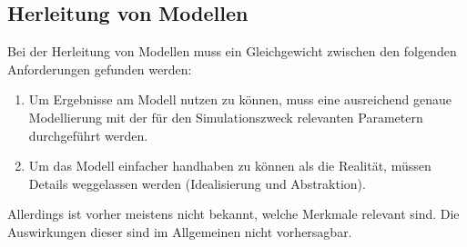         \subsection{Herleitung von Modellen} %
            Bei der Herleitung von Modellen muss ein Gleichgewicht zwischen den folgenden Anforderungen gefunden werden:
            \begin{enumerate}
            	\item Um Ergebnisse am Modell nutzen zu können, muss eine ausreichend genaue Modellierung mit der für den Simulationszweck relevanten Parametern durchgeführt werden.
            	\item Um das Modell einfacher handhaben zu können als die Realität, müssen Details weggelassen werden (Idealisierung und Abstraktion).
            \end{enumerate}
            Allerdings ist vorher meistens nicht bekannt, welche Merkmale relevant sind. Die Auswirkungen dieser sind im Allgemeinen nicht vorhersagbar.
            
